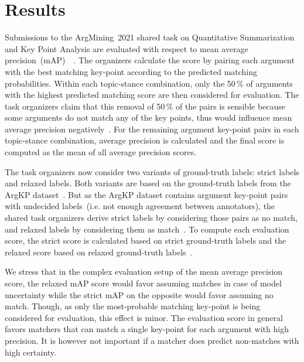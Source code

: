 \section{Results}\label{results}

Submissions to the ArgMining~2021 shared task on Quantitative Summarization and Key Point Analysis are evaluated with respect to mean average precision~(mAP)~\todocite~.
The organizers calculate the score by pairing each argument with the best matching key-point according to the predicted matching probabilities.
Within each topic-stance combination, only the 50\,\% of arguments with the highest predicted matching score are then considered for evaluation.
The task organizers claim that this removal of 50\,\% of the pairs is sensible because some arguments do not match any of the key points, thus would influence mean average precision negatively~\todocite.
For the remaining argument key-point pairs in each topic-stance combination, average precision is calculated and the final score is computed as the mean of all average precision scores.

The task organizers now consider two variants of ground-truth labels: strict labels and relaxed labels.
Both variants are based on the ground-truth labels from the ArgKP dataset~\cite{Bar-HaimEFKLS2020}. But as the ArgKP dataset contains argument key-point pairs with undecided labels~(i.e. not enough agreement between annotators), the shared task organizers derive strict labels by considering those pairs as no match, and relaxed labels by considering them as match~\todocite.
To compute each evaluation score, the strict score is calculated based on strict ground-truth labels and the relaxed score based on relaxed ground-truth labels~\todocite.

We stress that in the complex evaluation setup of the mean average precision score, the relaxed mAP score would favor assuming matches in case of model uncertainty while the strict mAP on the opposite would favor assuming no match.
Though, as only the most-probable matching key-point is being considered for evaluation, this effect is minor.
The evaluation score in general favors matchers that can match a single key-point for each argument with high precision.
It is however not important if a matcher does predict non-matches with high certainty.

